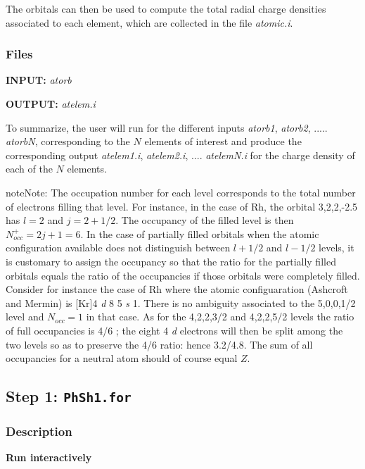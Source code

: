 \documentclass[letterpaper,10pt,english]{sphinxmanual}
\begin{document}
The orbitals can then be used to compute the total radial charge
densities associated to each element, which are collected in the
file \emph{atomic.i}.


\subsubsection{Files}
\label{phshift2007:files}
\textbf{INPUT:} \emph{atorb}

\textbf{OUTPUT:} \emph{atelem.i}

To summarize, the user will run  for the different inputs
\emph{atorb1}, \emph{atorb2}, ..... \emph{atorbN}, corresponding to the \(N\) elements of
interest and produce the corresponding output \emph{atelem1.i},
\emph{atelem2.i}, .... \emph{atelemN.i} for the charge density of each of the
\(N\) elements.

\begin{notice}{note}{Note:}
The occupation number for each level corresponds to the
total number of electrons filling that level. For
instance, in the case of Rh, the orbital 3,2,2,-2.5
has \(l = 2\) and \(j = 2 + 1/2\). The occupancy of the filled level
is then \(N^+_{occ} = 2j + 1 = 6\).
In the case of partially filled orbitals when the atomic
configuration available does not distinguish between
\(l + 1/2\) and \(l - 1/2\) levels, it is customary to assign the
occupancy so that the ratio for the partially filled
orbitals equals the ratio of the occupancies if those
orbitals were completely filled. Consider for instance
the case of Rh where the atomic configuaration (Ashcroft
and Mermin) is {[}Kr{]}4 \emph{d} 8 5 \emph{s} 1. There is no ambiguity
associated to the 5,0,0,1/2 level and \(N_{occ} = 1\) in that case.
As for the 4,2,2,3/2 and 4,2,2,5/2 levels the ratio of
full occupancies is 4/6 ; the eight 4 \emph{d} electrons will then be
split among the two levels so as to preserve the 4/6
ratio: hence 3.2/4.8. The sum of all occupancies for a
neutral atom should of course equal \(Z\).
\end{notice}


\subsection{Step 1: \texttt{PhSh1.for}}
\label{phshift2007:step-1-phsh1-for}

\subsubsection{Description}
\label{phshift2007:id1}
\textbf{Run interactively}
\end{document}
